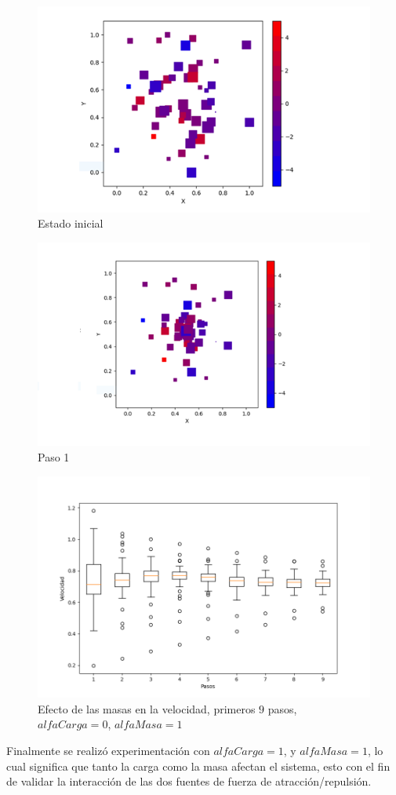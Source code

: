 \documentclass{article}
\begin{document}
		\begin{figure}[h!]
		\centering
		\includegraphics[width=0.7\linewidth]{Figure_3.png}
		\caption{Estado inicial}
		\label{fig:imagen3}
		\end{figure}
		\newpage
		\begin{figure}[h!]
		\centering
		\includegraphics[width=0.8\linewidth]{Figure_4.png}
		\caption{Paso 1}
		\label{fig:imagen4}
		\end{figure}

		\begin{figure}[h!]
		\centering
		\includegraphics[width=0.8\linewidth]{bx_2.png}
		\caption{Efecto de las masas en la velocidad, primeros $9$ pasos, $alfaCarga=0$, $alfaMasa=1$}
		\label{fig:bx2}
	\end{figure}
    \newpage
	Finalmente se realizó experimentación con $alfaCarga = 1$, y $alfaMasa = 1$,  lo cual significa que tanto la carga como la masa afectan el sistema, esto con el fin de validar la interacción de las dos fuentes de fuerza de atracción/repulsión.
	
\end{document}
